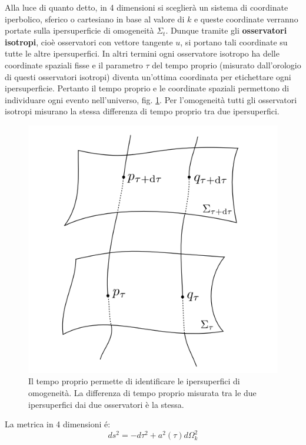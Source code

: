 Alla luce di quanto detto, in 4 dimensioni si sceglierà un sistema di coordinate iperbolico, sferico o cartesiano in base al valore di $k$ e queste coordinate verranno portate sulla ipersuperficie di omogeneità $\Sigma_t$.
Dunque tramite gli \textbf{osservatori isotropi}, cioè osservatori con vettore tangente $u$, si portano tali coordinate su tutte le altre ipersuperfici. In altri termini ogni osservatore isotropo ha delle coordinate spaziali fisse e il parametro $\tau$ del tempo proprio (misurato dall'orologio di questi osservatori isotropi) diventa un'ottima coordinata per etichettare ogni ipersuperficie. Pertanto il tempo proprio e le coordinate spaziali permettono di individuare ogni evento nell'universo, fig. \ref{fig.osservatori_iso}.
Per l'omogeneità tutti gli osservatori isotropi misurano la stessa differenza di tempo proprio tra due ipersuperfici.
\begin{figure}
    \centering
    \includegraphics[scale=0.5]{immagini/osservatori_isotropi.png}
    \caption{Il tempo proprio permette di identificare le ipersuperfici di omogeneità. La differenza di tempo proprio misurata tra le due ipersuperfici dai due osservatori è la stessa.}
    \label{fig.osservatori_iso}
\end{figure}
La metrica in 4 dimensioni é:
\begin{equation}
    ds^2 = -d\tau^2 + a^2(\tau)d\Omega_k^2
    \label{eq.metrica_flrw}
\end{equation}
